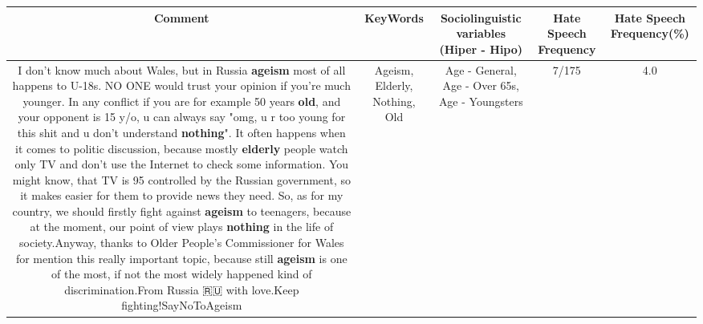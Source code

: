 \documentclass[11pt]{article}
\newlength\mylength
\begin{document}
\begin{center}
\setlength\mylength{\dimexpr\textwidth - 1\arrayrulewidth - 50\tabcolsep}
\begin{longtable}{|C{.65\mylength}|C{.30\mylength}|C{.12\mylength}|C{.12\mylength}|C{.12\mylength}|}
\hline
\textbf{Comment} & \textbf{KeyWords} & \textbf{Sociolinguistic variables (Hiper - Hipo)}  & \textbf{Hate Speech Frequency} & \textbf{Hate Speech Frequency(\%)} \\
\hline{}\small I don't know much about Wales, but in Russia \textbf{ageism} most of all happens to U-18s. NO ONE would trust your opinion if you're much younger. In any conflict if you are for example 50 years \textbf{old}, and your opponent is 15 y/o, u can always say "omg, u r too young for this shit and u don't understand \textbf{nothing}". It often happens when it comes to politic discussion, because mostly \textbf{elderly} people watch only TV and don't use the Internet to check some information. You might know, that TV is 95 controlled by the Russian government, so it makes easier for them to provide news they need. So, as for my country, we should firstly fight against \textbf{ageism} to teenagers, because at the moment, our point of view plays \textbf{nothing} in the life of society.Anyway, thanks to Older People's Commissioner for Wales for mention this really important topic, because still \textbf{ageism} is one of the most, if not the most widely happened kind of discrimination.From Russia 🇷🇺 with love.Keep fighting!SayNoToAgeism\normalsize   & Ageism, Elderly, Nothing, Old & Age - General, Age - Over 65s, Age - Youngsters & 7/175 & 4.0 \\  \hline

\end{longtable}
\end{center}
\end{document}
